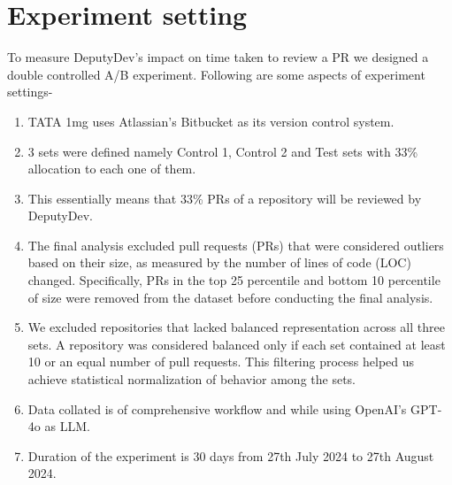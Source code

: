 \section{Experiment setting}
To measure DeputyDev's impact on time taken to review a PR we designed a double controlled A/B experiment. Following are some aspects of experiment settings-

\begin{enumerate}
    \item TATA 1mg uses Atlassian's Bitbucket as its version control system.
    \item 3 sets were defined namely Control 1, Control 2 and Test sets with 33\% allocation to each one of them.
    \item This essentially means that 33\% PRs of a repository will be reviewed by DeputyDev.
    \item The final analysis excluded pull requests (PRs) that were considered outliers based on their size, as measured by the number of lines of code (LOC) changed. Specifically, PRs in the top 25 percentile and bottom 10 percentile of size were removed from the dataset before conducting the final analysis.
    \item We excluded repositories that lacked balanced representation across all three sets. A repository was considered balanced only if each set contained at least 10 or an equal number of pull requests. This filtering process helped us achieve statistical normalization of behavior among the sets.
    \item Data collated is of comprehensive workflow and while using OpenAI's GPT-4o as LLM.
    \item Duration of the experiment is 30 days from 27th July 2024 to 27th August 2024.
\end{enumerate}